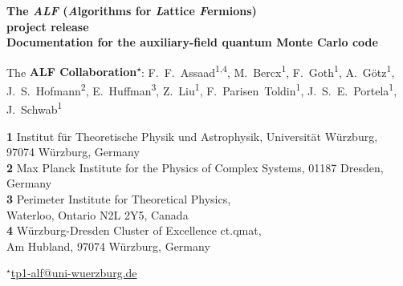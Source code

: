 

	
\begin{center}{\Large \textbf{
The \emph{ALF} (\emph{A}lgorithms for \emph{L}attice \emph{F}ermions)\\project release \ALFver\\
{\normalsize Documentation for the  auxiliary-field quantum Monte Carlo code}
}}\end{center}

\begin{center}
The \textbf{ALF Collaboration\textsuperscript{$\star$}}:
F.~F.~Assaad\textsuperscript{1,4},
M.~Bercx\textsuperscript{1},
F.~Goth\textsuperscript{1},
A.~G\"otz\textsuperscript{1},
J.~S.~Hofmann\textsuperscript{2},
E.~Huffman\textsuperscript{3},
Z.~Liu\textsuperscript{1},
F.~Parisen~Toldin\textsuperscript{1},
J.~S.~E.~Portela\textsuperscript{1},
J.~Schwab\textsuperscript{1}
\end{center}

\begin{center}
{\bf 1} Institut f\"ur Theoretische Physik und Astrophysik, Universit\"at W\"urzburg,\\
97074 W\"urzburg, Germany\\
{\bf 2} Max Planck Institute for the Physics of Complex Systems, 01187 Dresden, Germany\\
{\bf 3} Perimeter Institute for Theoretical Physics,\\
Waterloo, Ontario N2L 2Y5, Canada\\
{\bf 4} W\"urzburg-Dresden Cluster of Excellence ct.qmat, \\ Am Hubland, 97074 W\"urzburg, Germany

${}^\star$\href{mailto:tp1-alf@uni-wuerzburg.de}{\small \sf tp1-alf@uni-wuerzburg.de}
\end{center}

